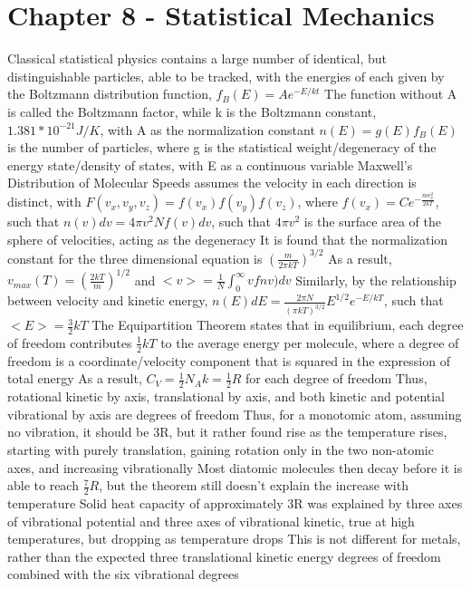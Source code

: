 \documentclass[11 pt, twoside]{article}
\newenvironment{outline*}
{
	\begin{outline}[enumerate]
	}
	{\end{outline}
}
\begin{document}
\section{Chapter 8 - Statistical Mechanics}
\begin{outline*}
\1 Classical statistical physics contains a large number of identical, but distinguishable particles, able to be tracked, with the energies of each given by the Boltzmann distribution function, $f_B(E) = Ae^{-E/kt}$
	\2 The function without A is called the Boltzmann factor, while k is the Boltzmann constant, $1.381 * 10^{-21} J/K$, with A as the normalization constant
	\2 $n(E) = g(E)f_B(E)$ is the number of particles, where g is the statistical weight/degeneracy of the energy state/density of states, with E as a continuous variable
	\2 Maxwell's Distribution of Molecular Speeds assumes the velocity in each direction is distinct, with $F(v_x, v_y, v_z) = f(v_x)f(v_y)f(v_z)$, where $f(v_x) = Ce^{-\frac{mv_x^2}{2kT}}$, such that $n(v)dv = 4\pi v^2 N f(v)dv$, such that $4\pi v^2$ is the surface area of the sphere of velocities, acting as the degeneracy
		\3 It is found that the normalization constant for the three dimensional equation is $(\frac{m}{2\pi k T})^{3/2}$
		\3 As a result, $v_{max}(T) = (\frac{2kT}{m})^{1/2}$ and $<v> = \frac{1}{N}\int^{\infty}_{0} v fnv) dv$
		\3 Similarly, by the relationship between velocity and kinetic energy, $n(E)dE = \frac{2\pi N}{(\pi k T)^{3/2}}E^{1/2}e^{-E/kT}$, such that $<E> = \frac{3}{2}kT$
	\2 The Equipartition Theorem states that in equilibrium, each degree of freedom contributes $\frac{1}{2}kT$ to the average energy per molecule, where a degree of freedom is a coordinate/velocity component that is squared in the expression of total energy
		\3 As a result, $C_V = \frac{1}{2}N_Ak = \frac{1}{2}R$ for each degree of freedom
		\3 Thus, rotational kinetic by axis, translational by axis, and both kinetic and potential vibrational by axis are degrees of freedom
			\4 Thus, for a monotomic atom, assuming no vibration, it should be 3R, but it rather found rise as the temperature rises, starting with purely translation, gaining rotation only in the two non-atomic axes, and increasing vibrationally
			\4 Most diatomic molecules then decay before it is able to reach $\frac{7}{2}R$, but the theorem still doesn't explain the increase with temperature
		\3 Solid heat capacity of approximately 3R was explained by three axes of vibrational potential and three axes of vibrational kinetic, true at high temperatures, but dropping as temperature drops
			\4 This is not different for metals, rather than the expected three translational kinetic energy degrees of freedom combined with the six vibrational degrees

\end{outline*}
\end{document}
